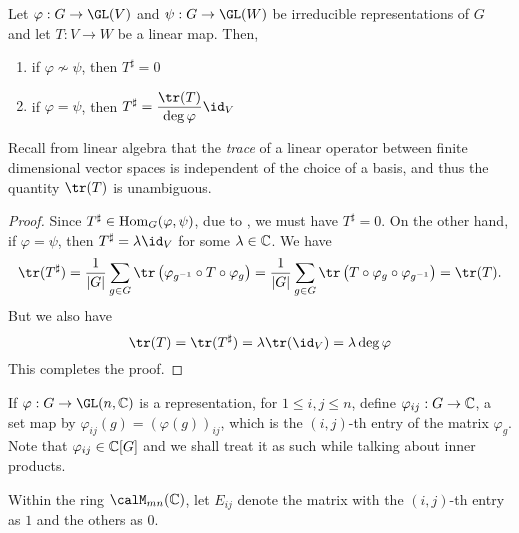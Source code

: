 \begin{proposition}
    Let $\varphi: G\to\GL(V)$ and $\psi: G\to\GL(W)$ be irreducible representations of $G$ and let $T: V\to W$ be a linear map. Then, 
    \begin{enumerate}[label=(\alph*)]
        \item if $\varphi\not\sim\psi$, then $T^\sharp = 0$ 
        \item if $\varphi = \psi$, then $\displaystyle T^\sharp = \frac{\tr(T)}{\deg\varphi}\id_V$
    \end{enumerate}
\end{proposition}
Recall from linear algebra that the \textit{trace} of a linear operator between finite dimensional vector spaces is independent of the choice of a basis, and thus the quantity $\tr(T)$ is unambiguous.
\begin{proof}
    Since $T^\sharp\in\operatorname{Hom}_G(\varphi,\psi)$, due to , we must have $T^\sharp = 0$. On the other hand, if $\varphi = \psi$, then $T^\sharp = \lambda\id_V$ for some $\lambda\in\mathbb{C}$. We have 
    \begin{equation*}
        \tr(T^\sharp) = \frac{1}{|G|}\sum_{g\in G}\tr\left(\varphi_{g^{-1}}\circ T\circ\varphi_g\right) = \frac{1}{|G|}\sum_{g\in G}\tr\left(T\circ\varphi_g\circ\varphi_{g^{-1}}\right) = \tr(T).
    \end{equation*}
    But we also have 
    \begin{equation*}
        \tr(T) = \tr(T^\sharp) = \lambda\tr(\id_V) = \lambda\deg\varphi
    \end{equation*}
    This completes the proof.
\end{proof}

If $\varphi: G\to\GL(n,\bbC)$ is a representation, for $1\le i,j\le n$, define $\varphi_{ij}: G\to\mathbb{C}$, a set map by $\varphi_{ij}(g) = (\varphi(g))_{ij}$, which is the $(i,j)$-th entry of the matrix $\varphi_g$. Note that $\varphi_{ij}\in\mathbb{C}[G]$ and we shall treat it as such while talking about inner products.

Within the ring $\calM_{mn}(\bbC)$, let $E_{ij}$ denote the matrix with the $(i,j)$-th entry as $1$ and the others as $0$.

